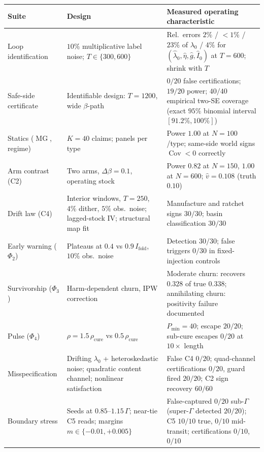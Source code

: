 \documentclass[11pt]{article}
\theoremstyle{definition}
\theoremstyle{remark}
\numberwithin{equation}{section}
\DeclareMathOperator{\Cov}{Cov}
\DeclareMathOperator{\MG}{MG}
\begin{document}
\begin{center}\small
\begin{tabular}{>{\raggedright\arraybackslash}p{3.1cm}>{\raggedright\arraybackslash}p{6.0cm}>{\raggedright\arraybackslash}p{4.3cm}}
\toprule
Suite & Design & Measured operating characteristic \\
\midrule
Loop identification & $10\%$ multiplicative label noise; $T \in \{300, 600\}$ & Rel.\ errors $2\%$ / $<\!1\%$ / $23\%$ of $\lambda_0$ / $4\%$ for $(\hat\lambda_0,\hat\eta,\hat g,\hat I_0)$ at $T{=}600$; shrink with $T$ \\
Safe-side certificate & Identifiable design: $T{=}1200$, wide $\beta$-path & $0/20$ false certifications; $19/20$ power; $40/40$ empirical two-SE coverage (exact $95\%$ binomial interval $[91.2\%,100\%]$) \\
Statics ($\MG$, regime) & $K{=}40$ claims; panels per type & Power $1.00$ at $N{=}100$/type; same-side world signs $\Cov < 0$ correctly \\
Arm contrast (C2) & Two arms, $\Delta\beta = 0.1$, operating stock & Power $0.82$ at $N{=}150$, $1.00$ at $N{=}600$; $\hat v = 0.108$ (truth $0.10$) \\
Drift law (C4) & Interior windows, $T{=}250$, $4\%$ dither, $5\%$ obs.\ noise; lagged-stock IV; structural map fit & Manufacture and ratchet signs $30/30$; basin classification $30/30$ \\
Early warning ($\Phi_2$) & Plateaus at $0.4$ vs $0.9\,I_{\mathrm{fold}}$, $10\%$ obs.\ noise & Detection $30/30$; false triggers $0/30$ in fixed-injection controls \\
Survivorship ($\Phi_3$) & Harm-dependent churn, IPW correction & Moderate churn: recovers $0.328$ of true $0.338$; annihilating churn: positivity failure documented \\
Pulse ($\Phi_4$) & $\rho = 1.5\,\rho_{\mathrm{cure}}$ vs $0.5\,\rho_{\mathrm{cure}}$ & $P_{\min} = 40$; escape $20/20$; sub-cure escapes $0/20$ at $10\times$ length \\
Misspecification & Drifting $\lambda_0$ + heteroskedastic noise; quadratic content channel; nonlinear satisfaction & False C4 $0/20$; quad-channel certifications $0/20$, guard fired $20/20$; C2 sign recovery $60/60$ \\
Boundary stress & Seeds at $0.85$--$1.15\,\Gamma$; near-tie C5 reads; margins $m \in \{-0.01, +0.005\}$ & False-captured $0/20$ sub-$\Gamma$ (super-$\Gamma$ detected $20/20$); C5 $10/10$ true, $0/10$ mid-transit; certifications $0/10$, $0/10$ \\
\bottomrule
\end{tabular}
\end{center}
\end{document}
